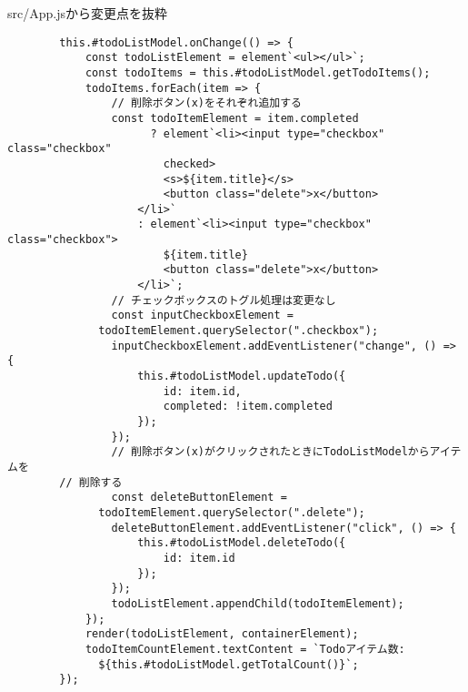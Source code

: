 \begin{listtitle}
src/App.jsから変更点を抜粋
\end{listtitle}
\begin{lstlisting}
        this.#todoListModel.onChange(() => {
            const todoListElement = element`<ul></ul>`;
            const todoItems = this.#todoListModel.getTodoItems();
            todoItems.forEach(item => {
                // 削除ボタン(x)をそれぞれ追加する
                const todoItemElement = item.completed
                      ? element`<li><input type="checkbox" class="checkbox"
                        checked>
                        <s>${item.title}</s>
                        <button class="delete">x</button>
                    </li>`
                    : element`<li><input type="checkbox" class="checkbox">
                        ${item.title}
                        <button class="delete">x</button>
                    </li>`;
                // チェックボックスのトグル処理は変更なし
                const inputCheckboxElement =
		      todoItemElement.querySelector(".checkbox");
                inputCheckboxElement.addEventListener("change", () => {
                    this.#todoListModel.updateTodo({
                        id: item.id,
                        completed: !item.completed
                    });
                });
                // 削除ボタン(x)がクリックされたときにTodoListModelからアイテムを
		// 削除する
                const deleteButtonElement =
		      todoItemElement.querySelector(".delete");
                deleteButtonElement.addEventListener("click", () => {
                    this.#todoListModel.deleteTodo({
                        id: item.id
                    });
                });
                todoListElement.appendChild(todoItemElement);
            });
            render(todoListElement, containerElement);
            todoItemCountElement.textContent = `Todoアイテム数:
              ${this.#todoListModel.getTotalCount()}`;
        });
\end{lstlisting}
\listend
